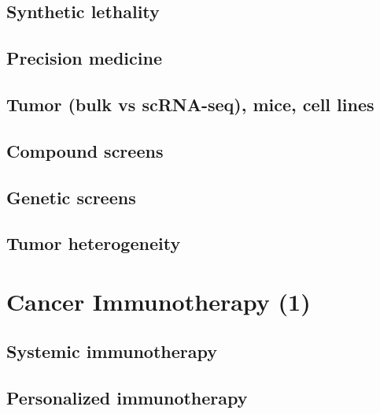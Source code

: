 \documentclass[
]{book}
\begin{document}
\hypertarget{synthetic-lethality}{%
\section{Synthetic lethality}\label{synthetic-lethality}}

\hypertarget{precision-medicine}{%
\section{Precision medicine}\label{precision-medicine}}

\hypertarget{tumor-bulk-vs-scrna-seq-mice-cell-lines}{%
\section{Tumor (bulk vs scRNA-seq), mice, cell lines}\label{tumor-bulk-vs-scrna-seq-mice-cell-lines}}

\hypertarget{compound-screens}{%
\section{Compound screens}\label{compound-screens}}

\hypertarget{genetic-screens}{%
\section{Genetic screens}\label{genetic-screens}}

\hypertarget{tumor-heterogeneity}{%
\section{Tumor heterogeneity}\label{tumor-heterogeneity}}

\hypertarget{cancerimmuno1}{%
\chapter{Cancer Immunotherapy (1)}\label{cancerimmuno1}}

\hypertarget{systemic-immunotherapy}{%
\section{Systemic immunotherapy}\label{systemic-immunotherapy}}

\hypertarget{personalized-immunotherapy}{%
\section{Personalized immunotherapy}\label{personalized-immunotherapy}}
\end{document}
